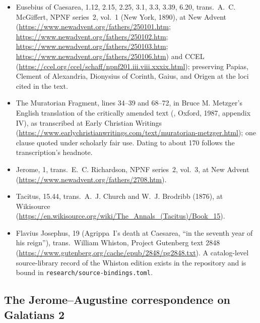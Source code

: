 \begin{itemize}
\item Eusebius of Caesarea,  1.12, 2.15, 2.25, 3.1,
3.3, 3.39, 6.20, trans.\ A.~C. McGiffert, NPNF series~2, vol.~1 (New York,
1890), at New Advent (\url{https://www.newadvent.org/fathers/250101.htm};
\url{https://www.newadvent.org/fathers/250102.htm};
\url{https://www.newadvent.org/fathers/250103.htm};
\url{https://www.newadvent.org/fathers/250106.htm}) and CCEL
(\url{https://ccel.org/ccel/schaff/npnf201.iii.viii.xxxix.html});
preserving Papias, Clement of Alexandria, Dionysius of Corinth, Gaius, and
Origen at the loci cited in the text.
\item The Muratorian Fragment, lines 34--39 and 68--72, in Bruce M.
Metzger's English translation of the critically amended text
(, Oxford, 1987, appendix IV), as
transcribed at Early Christian Writings
(\url{https://www.earlychristianwritings.com/text/muratorian-metzger.html});
one clause quoted under scholarly fair use. Dating to about 170 follows the
transcription's headnote.
\item Jerome,  1, trans.\ E.~C. Richardson, NPNF
series~2, vol.~3, at New Advent
(\url{https://www.newadvent.org/fathers/2708.htm}).
\item Tacitus,  15.44, trans.\ A.~J. Church and W.~J.
Brodribb (1876), at Wikisource
(\url{https://en.wikisource.org/wiki/The_Annals_(Tacitus)/Book_15}).
\item Flavius Josephus,  19 (Agrippa~I's death
at Caesarea, ``in the seventh year of his reign''), trans.\ William Whiston,
Project Gutenberg text 2848
(\url{https://www.gutenberg.org/cache/epub/2848/pg2848.txt}). A
catalog-level source-library record of the Whiston edition exists in the
repository and is bound in \texttt{research/source-bindings.toml}.
\end{itemize}

\subsection*{The Jerome--Augustine correspondence on Galatians 2}

